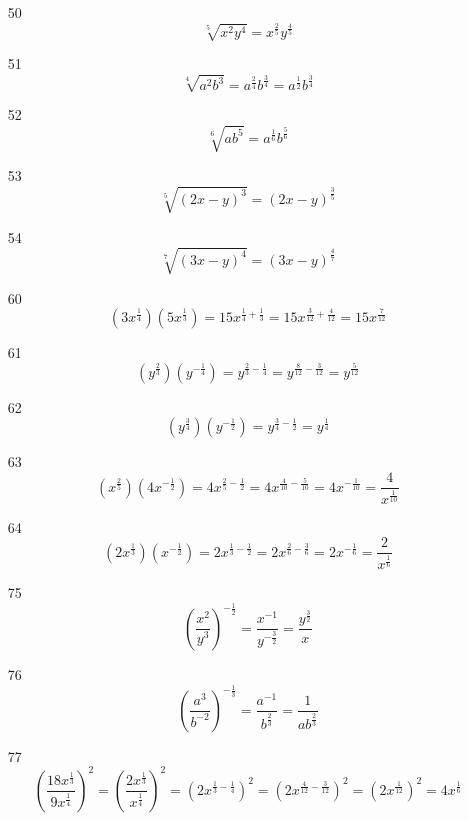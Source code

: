 \documentclass[fleqn,addpoints]{exam}
\begin{document}
\begin{itemize}
\item[50]
\[
  \sqrt[5]{x^2y^4} = x^{\frac{2}{5}} y^{\frac{4}{5}}
\]

\item[51]
\[
  \sqrt[4]{a^2b^3} = a^{\frac{2}{4}} b^{\frac{3}{4}} = a^{\frac{1}{2}} b^{\frac{3}{4}}
\]

\item[52]
\[
  \sqrt[6]{ab^5} = a^{\frac{1}{6}} b^{\frac{5}{6}}
\]

\item[53]
\[
  \sqrt[5]{(2x-y)^3} = (2x-y)^{\frac{3}{5}}
\]

\item[54]
\[
  \sqrt[7]{(3x-y)^4} = (3x-y)^{\frac{4}{7}}
\]

\item[60]
\[
  (3x^{\frac{1}{4}})(5x^{\frac{1}{3}}) = 15x^{\frac{1}{4} + \frac{1}{3}} = 15x^{\frac{3}{12} + \frac{4}{12}} = 15x^{\frac{7}{12}}
\]

\item[61]
\[
  (y^{\frac{2}{3}})(y^{-\frac{1}{4}}) = y^{\frac{2}{3} - \frac{1}{4}} = y^{\frac{8}{12} - \frac{3}{12}} = y^{\frac{5}{12}}
\]

\item[62]
\[
  (y^{\frac{3}{4}})(y^{- \frac{1}{2}}) = y^{\frac{3}{4} - \frac{1}{2}} = y^{\frac{1}{4}}
\]

\item[63]
\[
  (x^{\frac{2}{5}}) (4x^{-\frac{1}{2}}) = 4x^{\frac{2}{5} - \frac{1}{2}} = 4x^{\frac{4}{10} - \frac{5}{10}} 
  = 4x^{-\frac{1}{10}} = \frac{4}{x^{\frac{1}{10}}}
\]

\item[64]
\[
  (2x^{\frac{1}{3}})(x^{-\frac{1}{2}}) 
  = 2x^{\frac{1}{3} - \frac{1}{2}} 
  = 2x^{\frac{2}{6} - \frac{3}{6}} 
  = 2x^{-\frac{1}{6}} 
  = \frac{2}{x^{\frac{1}{6}}}
\]

\item[75]
\[
  \left( \frac{x^2}{y^3} \right)^{- \frac{1}{2}}
  = \frac{x^{-1}}{y^{-\frac{3}{2}}} 
  = \frac{y^{\frac{3}{2}}}{x}
\]

\item[76]
\[
  \left( \frac{a^3}{b^{-2}} \right)^{- \frac{1}{3}}
  = \frac{a^{-1}}{b^{\frac{2}{3}}} 
  = \frac{1}{ab^{\frac{2}{3}}} 
\]

\item[77]
\[
  \left( \frac{18x^{\frac{1}{3}}}{9x^{\frac{1}{4}}} \right)^2
  = \left( \frac{2x^{\frac{1}{3}}}{x^{\frac{1}{4}}} \right)^2
  = (2x^{\frac{1}{3} - \frac{1}{4}})^2
  = (2x^{\frac{4}{12} - \frac{3}{12}})^2
  = (2x^{\frac{1}{12}})^2
  = 4 x^{\frac{1}{6}}
\]


\end{itemize}
\end{document}
